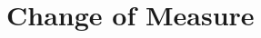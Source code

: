 \documentclass[12pt,a4paper]{book}
\begin{document}
%
%
%
%
%
%
%
%

\chapter{Change of Measure}
\end{document}
